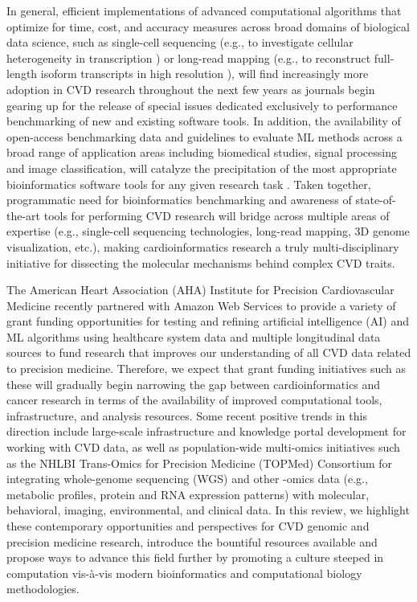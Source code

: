 \documentclass[letter]{bib}
\begin{document}
In general, efficient implementations of advanced computational algorithms that optimize for time, cost, and accuracy measures across broad domains of biological data science, such as single-cell sequencing \citep{Becht:2018:Evaluation} (e.g., to investigate cellular heterogeneity in transcription \citep{Wirka:2018:Advancesa}) or long-read mapping \citep{Li:2018:Minimap2} (e.g., to reconstruct full-length isoform transcripts in high resolution \citep{Wirka:2018:Advancesa}), will find increasingly more adoption in CVD research throughout the next few years as journals begin gearing up for the release of special issues dedicated exclusively to performance benchmarking of new and existing software tools.  In addition, the availability of open-access benchmarking data and guidelines to evaluate ML methods across a broad range of application areas including biomedical studies, signal processing and image classification, will catalyze the precipitation of the most appropriate bioinformatics software tools for any given research task \citep{Olson:2017:PMLB,Weber:2018:Essential}.  Taken together, programmatic need for bioinformatics benchmarking and awareness of state-of-the-art tools for performing CVD research will bridge across multiple areas of expertise (e.g., single-cell sequencing technologies, long-read mapping, 3D genome visualization, etc.), making cardioinformatics research a truly multi-disciplinary initiative for dissecting the molecular mechanisms behind complex CVD traits.   


The American Heart Association (AHA) Institute for Precision Cardiovascular Medicine recently partnered with Amazon Web Services to provide a variety of grant funding opportunities for testing and refining artificial intelligence (AI) and ML algorithms using healthcare system data and multiple longitudinal data sources to fund research that improves our understanding of all CVD data related to precision medicine.  Therefore, we expect that grant funding initiatives such as these will gradually begin narrowing the gap between cardioinformatics and cancer research in terms of the availability of improved computational tools, infrastructure, and analysis resources.  Some recent positive trends in this direction include large-scale infrastructure and knowledge portal development \citep{Khomtchouk:2019:HeartBioPortal,Kass-Hout:2018:American,Crawford:2018:Cerebrovascular} for working with CVD data, as well as population-wide multi-omics initiatives such as the NHLBI Trans-Omics for Precision Medicine (TOPMed) Consortium \citep{NHLBI:2014:TransOmics} for integrating whole-genome sequencing (WGS) and other -omics data (e.g., metabolic profiles, protein and RNA expression patterns) with molecular, behavioral, imaging, environmental, and clinical data.  In this review, we highlight these contemporary opportunities and perspectives for CVD genomic and precision medicine research, introduce the bountiful resources available and propose ways to advance this field further by promoting a culture steeped in computation vis-\`{a}-vis modern bioinformatics and computational biology methodologies.
\end{document}
